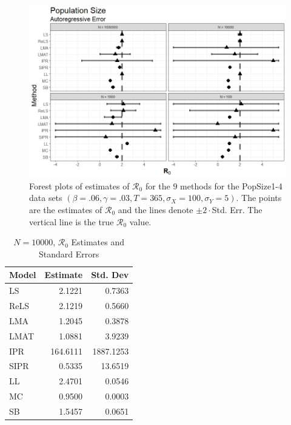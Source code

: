\documentclass[12pt]{article}
\newcommand{\xxsir}{\ensuremath{9} } %
\newcommand{\rr}{\ensuremath{\mathcal{R}_0}}
\begin{document}
\begin{figure}[H]
	\centering
	\includegraphics[scale=0.5]{images/popsize_ar.jpeg}
	\caption{Forest plots of estimates of $\rr$ for the \xxsir methods for the PopSize1-4 data sets $(\beta=.06, \gamma=.03, T=365, \sigma_X=100, \sigma_Y=5)$.  The points are the estimates of $\rr$ and the lines denote $\pm 2\cdot $Std. Err.  The vertical line is the true $\rr$ value.}
\end{figure}

\begin{table}[H]
	
	\centering
	\begin{tabular}[t]{l|r|r}
		\hline
		Model & Estimate & Std. Dev\\
		\hline
		LS & 2.1221 & 0.7363\\
		\hline
		ReLS & 2.1219 & 0.5660\\
		\hline
		LMA & 1.2045 & 0.3878\\
		\hline
		LMAT & 1.0881 & 3.9239\\
		\hline
		IPR & 164.6111 & 1887.1253\\
		\hline
		SIPR & 0.5335 & 13.6519\\
		\hline
		LL & 2.4701 & 0.0546\\
		\hline
		MC & 0.9500 & 0.0003\\
		\hline
		SB & 1.5457 & 0.0651\\
		\hline
	\end{tabular}
	\caption{$N = 10000$, $\rr$ Estimates and Standard Errors}
\end{table}
\end{document}
